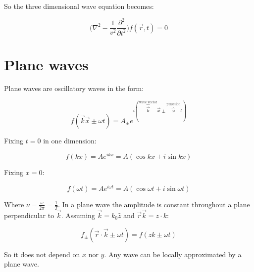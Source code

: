   So the three dimensional wave equation becomes:

  $$\biggl(\nabla^2 - \frac{1}{v^2}\frac{\partial^2{}}{\partial{t^2}}\biggr)f(\vec{r},t) = 0$$

\section{Plane waves}
Plane waves are oscillatory waves in the form:

$$f(\vec{k}\vec{x}\pm\omega t) = A_{\pm}e^{i(\overbrace{\vec{k}}^{\text{wave vector}}\vec{x}\pm\overbrace{\omega}^{\text{pulsation}} t)}$$

Fixing $t = 0$ in one dimension:

$$f(kx) = Ae^{ikx} = A(\cos kx + i\sin kx)$$

Fixing $x = 0$:

$$f(\omega t) = Ae^{i\omega t} = A(\cos\omega t + i\sin\omega t)$$

Where $\nu = \frac{\omega}{2\pi} = \frac{1}{T}$.
In a plane wave the amplitude is constant throughout a plane perpendicular to $\vec{k}$.
Assuming $\vec{k} = k_0\hat{z}$ and $\vec{r}\vec{k} = z\cdot k$:

$$f_\pm (\vec{r}\cdot \vec{k}\pm\omega t) = f(zk\pm \omega t)$$

So it does not depend on $x$ nor $y$.
Any wave can be locally approximated by a plane wave.
